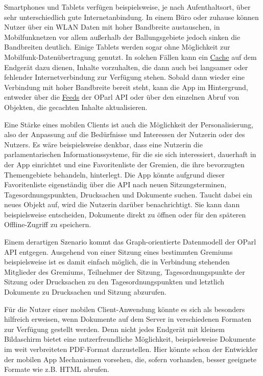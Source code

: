 \documentclass[,a4paper]{article}
\begin{document}
Smartphones und Tablets verfügen beispielsweise, je nach Aufenthaltsort,
über sehr unterschiedlich gute Internetanbindung. In einem Büro oder
zuhause können Nutzer über ein WLAN Daten mit hoher Bandbreite
austauschen, in Mobilfunknetzen vor allem außerhalb der Ballungsgebiete
jedoch sinken die Bandbreiten deutlich. Einige Tablets werden sogar ohne
Möglichkeit zur Mobilfunk-Datenübertragung genutzt. In solchen Fällen
kann ein \hyperref[cache]{Cache} auf dem Endgerät dazu dienen, Inhalte
vorzuhalten, die dann auch bei langsamer oder fehlender
Internetverbindung zur Verfügung stehen. Sobald dann wieder eine
Verbindung mit hoher Bandbreite bereit steht, kann die App im
Hintergrund, entweder über die \hyperref[feeds]{Feeds} der OParl API
oder über den einzelnen Abruf von Objekten, die gecachten Inhalte
aktualisieren.

Eine Stärke eines mobilen Clients ist auch die Möglichkeit der
Personalisierung, also der Anpassung auf die Bedürfnisse und Interessen
der Nutzerin oder des Nutzers. Es wäre beispielsweise denkbar, dass eine
Nutzerin die parlamentarischen Informationssysteme, für die sie sich
interessiert, dauerhaft in der App einrichtet und eine Favoritenliste
der Gremien, die ihre bevorzugten Themengebiete behandeln, hinterlegt.
Die App könnte aufgrund dieser Favoritenliste eigenständig über die API
nach neuen Sitzungsterminen, Tagesordnungspunkten, Drucksachen und
Dokumente suchen. Taucht dabei ein neues Objekt auf, wird die Nutzerin
darüber benachrichtigt. Sie kann dann beispielsweise entscheiden,
Dokumente direkt zu öffnen oder für den späteren Offline-Zugriff zu
speichern.

Einem derartigen Szenario kommt das Graph-orientierte Datenmodell der
OParl API entgegen. Ausgehend von einer Sitzung eines bestimmten
Gremiums beispielsweise ist es damit einfach möglich, die in Verbindung
stehenden Mitglieder des Gremiums, Teilnehmer der Sitzung,
Tagesordnungspunkte der Sitzung oder Drucksachen zu den
Tagesordnungspunkten und letztlich Dokumente zu Drucksachen und Sitzung
abzurufen.

Für die Nutzer einer mobilen Client-Anwendung könnte es sich als
besonders hilfreich erweisen, wenn Dokumente auf dem Server in
verschiedenen Formaten zur Verfügung gestellt werden. Denn nicht jedes
Endgerät mit kleinem Bildaschirm bietet eine nutzerfreundliche
Möglichkeit, beispielsweise Dokumente im weit verbreiteten PDF-Format
darzustellen. Hier könnte schon der Entwickler der mobilen App
Mechanismen vorsehen, die, sofern vorhanden, besser geeignete Formate
wie z.B. HTML abrufen.
\end{document}
